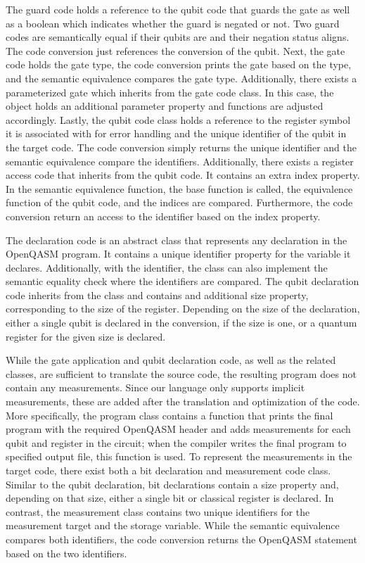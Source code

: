 The guard code holds a reference to the qubit code that guards the gate as well as a boolean which indicates whether the guard is negated or not. Two guard codes are semantically equal if their qubits are and their negation status aligns. The code conversion just references the conversion of the qubit.
Next, the gate code holds the gate type, the code conversion prints the gate based on the type, and the semantic equivalence compares the gate type. Additionally, there exists a parameterized gate which inherits from the gate code class. In this case, the object holds an additional parameter property and functions are adjusted accordingly. Lastly, the qubit code class holds a reference to the register symbol it is associated with for error handling and the unique identifier of the qubit in the target code. The code conversion simply returns the unique identifier and the semantic equivalence compare the identifiers. Additionally, there exists a register access code that inherits from the qubit code. It contains an extra index property. In the semantic equivalence function, the base function is called, \ie the equivalence function of the qubit code, and the indices are compared. Furthermore, the code conversion return an access to the identifier based on the index property. 

The declaration code is an abstract class that represents any declaration in the OpenQASM program. It contains a unique identifier property for the variable it declares. Additionally, with the identifier, the class can also implement the semantic equality check where the identifiers are compared. The qubit declaration code inherits from the class and contains and additional size property, corresponding to the size of the register. Depending on the size of the declaration, either a single qubit is declared in the conversion, if the size is one, or a quantum register for the given size is declared. 

While the gate application and qubit declaration code, as well as the related classes, are sufficient to translate the source code, the resulting program does not contain any measurements. Since our language only supports implicit measurements, these are added after the translation and optimization of the code. More specifically, the program class contains a function that prints the final program with the required OpenQASM header and adds measurements for each qubit and register in the circuit; when the compiler writes the final program to specified output file, this function is used. 
To represent the measurements in the target code, there exist both a bit declaration and measurement code class. Similar to the qubit declaration, bit declarations contain a size property and, depending on that size, either a single bit or classical register is declared. In contrast, the measurement class contains two unique identifiers for the measurement target and the storage variable. While the semantic equivalence compares both identifiers, the code conversion returns the OpenQASM statement based on the two identifiers.

